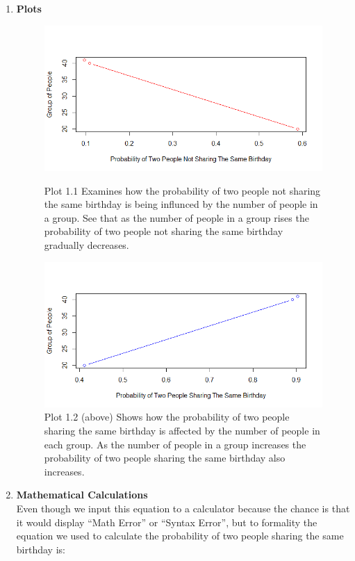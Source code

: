 \documentclass[12pt,letterpaper]{article}
\begin{document}
\begin{enumerate}[label=\Alph*]
	\pagebreak
	\item \textbf{Plots}
	\begin{figure}[H]
		\centering
		\includegraphics[scale=0.9]{fig1.1.png}
		\caption*{\footnotesize Plot 1.1 Examines how the probability of two people not sharing the same birthday is being influnced by the number of people in a group. See that as the number of people in a group rises the probability of two people not sharing the same birthday gradually decreases.}
		\includegraphics[scale=0.9]{fig1.2.png}
		\caption*{\footnotesize Plot 1.2 (above) Shows how the probability of two people sharing the same birthday is affected by the number of people in each group. As the number of people in a group increases the probability of two people sharing the same birthday also increases.}
	\end{figure}
	
	\pagebreak
	
\item \textbf{Mathematical Calculations}\\
	Even though we input this equation to a calculator because the chance is that it would display “Math Error” or “Syntax Error”, but to formality the equation we used to calculate the probability of two people sharing the same birthday is:
	

\end{enumerate}
\end{document}
